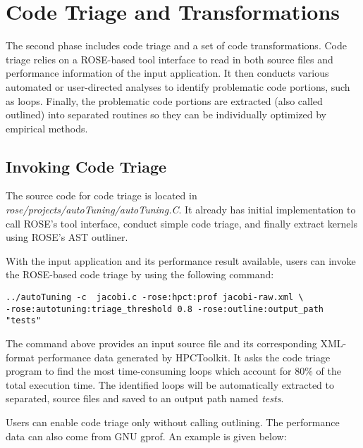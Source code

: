 \section{Code Triage and Transformations}
The second phase includes code triage and a set of code transformations. 
Code triage relies on a ROSE-based tool interface to read in both source files and performance information of
the input application.
It then conducts various automated or user-directed analyses to identify problematic code portions, such as loops. 
Finally, the problematic code portions are extracted (also called outlined) into separated routines so they can be individually
optimized by empirical methods. 

\subsection{Invoking Code Triage}
The source code for code triage is located in
\textit{rose/projects/autoTuning/autoTuning.C}. 
It already has initial implementation to call ROSE's tool interface,
conduct simple code triage, and finally extract kernels using ROSE's AST
outliner. 

With the input application and its performance result available, 
users can invoke the ROSE-based code triage by using the following command:

{\mySmallFontSize
\begin{verbatim}
../autoTuning -c  jacobi.c -rose:hpct:prof jacobi-raw.xml \
-rose:autotuning:triage_threshold 0.8 -rose:outline:output_path "tests"
\end{verbatim}
}

The command above provides an input source file and its corresponding XML-format performance data generated by HPCToolkit.
It asks the code triage program to find the most time-consuming 
loops which account for 80\% of the total execution time. 
The identified loops will be automatically extracted to separated,
source files and saved to an output path named \textit{tests}.

Users can enable code triage only without calling outlining. 
The performance data can also come from GNU gprof. 
An example is given below:

